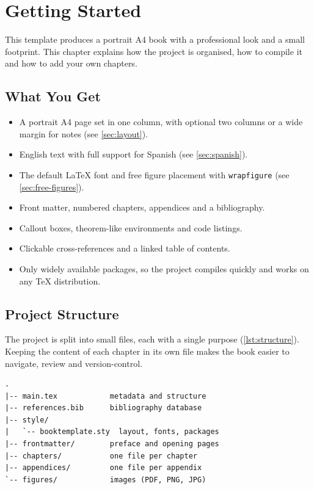 \chapter{Getting Started}\label{chap:getting-started}

This template produces a portrait A4 book with a professional look and a
small footprint. This chapter explains how the project is organised, how to
compile it and how to add your own chapters.

\section{What You Get}

\begin{itemize}
  \item A portrait A4 page set in one column, with optional two columns or a
        wide margin for notes (see \cref{sec:layout}).
  \item English text with full support for Spanish (see \cref{sec:spanish}).
  \item The default \LaTeX{} font and free figure placement with
        \texttt{wrapfigure} (see \cref{sec:free-figures}).
  \item Front matter, numbered chapters, appendices and a bibliography.
  \item Callout boxes, theorem-like environments and code listings.
  \item Clickable cross-references and a linked table of contents.
  \item Only widely available packages, so the project compiles quickly and
        works on any \TeX{} distribution.
\end{itemize}

\section{Project Structure}\label{sec:structure}

The project is split into small files, each with a single purpose
(\cref{lst:structure}). Keeping the content of each chapter in its own file
makes the book easier to navigate, review and version-control.

\begin{lstlisting}[language={}, caption={Layout of the project.}, label={lst:structure}, float=tb]
.
|-- main.tex            metadata and structure
|-- references.bib      bibliography database
|-- style/
|   `-- booktemplate.sty  layout, fonts, packages
|-- frontmatter/        preface and opening pages
|-- chapters/           one file per chapter
|-- appendices/         one file per appendix
`-- figures/            images (PDF, PNG, JPG)
\end{lstlisting}

